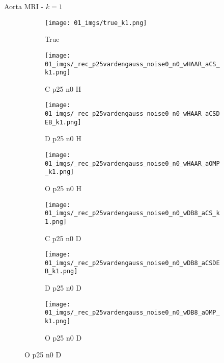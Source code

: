 \begin{frame}{Aorta MRI - $k=1$}{}
\begin{figure}
\begin{subfigure}{0.13\textwidth}
\texttt{[image: 01\_imgs/true\_k1.png]}
\caption*{\tiny True}
\end{subfigure}
\begin{subfigure}{0.13\textwidth}
\texttt{[image: 01\_imgs/\_rec\_p25vardengauss\_noise0\_n0\_wHAAR\_aCS\_k1.png]}
\caption*{\tiny C p25 n0 H}
\end{subfigure}
\begin{subfigure}{0.13\textwidth}
\texttt{[image: 01\_imgs/\_rec\_p25vardengauss\_noise0\_n0\_wHAAR\_aCSDEB\_k1.png]}
\caption*{\tiny D p25 n0 H}
\end{subfigure}
\begin{subfigure}{0.13\textwidth}
\texttt{[image: 01\_imgs/\_rec\_p25vardengauss\_noise0\_n0\_wHAAR\_aOMP\_k1.png]}
\caption*{\tiny O p25 n0 H}
\end{subfigure}
\begin{subfigure}{0.13\textwidth}
\texttt{[image: 01\_imgs/\_rec\_p25vardengauss\_noise0\_n0\_wDB8\_aCS\_k1.png]}
\caption*{\tiny C p25 n0 D}
\end{subfigure}
\begin{subfigure}{0.13\textwidth}
\texttt{[image: 01\_imgs/\_rec\_p25vardengauss\_noise0\_n0\_wDB8\_aCSDEB\_k1.png]}
\caption*{\tiny D p25 n0 D}
\end{subfigure}
\begin{subfigure}{0.13\textwidth}
\texttt{[image: 01\_imgs/\_rec\_p25vardengauss\_noise0\_n0\_wDB8\_aOMP\_k1.png]}
\caption*{\tiny O p25 n0 D}
\end{subfigure}

\vspace{5pt}


\end{figure}
\end{frame}
